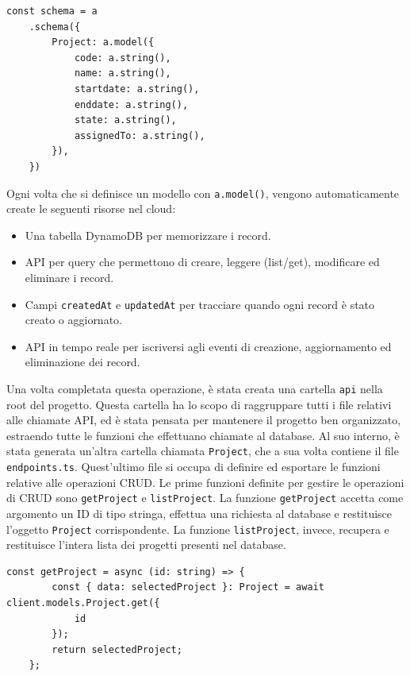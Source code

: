 \documentclass[target=bach,aauheader=,style=]{thud}
\begin{document}
\begin{lstlisting}[caption=Parte del file \texttt{amplify/data/resource.ts}]
    const schema = a
    .schema({
        Project: a.model({
            code: a.string(),
            name: a.string(),
            startdate: a.string(),
            enddate: a.string(),
            state: a.string(),
            assignedTo: a.string(),
        }),
    })
\end{lstlisting}
Ogni volta che si definisce un modello con \texttt{a.model()}, vengono automaticamente create le seguenti risorse nel cloud:
\begin{itemize}
    \item Una tabella DynamoDB per memorizzare i record.
    \item API per query che permettono di creare, leggere (list/get), modificare ed eliminare i record.
    \item Campi \texttt{createdAt} e \texttt{updatedAt} per tracciare quando ogni record è stato creato o aggiornato.
    \item API in tempo reale per iscriversi agli eventi di creazione, aggiornamento ed eliminazione dei record.
\end{itemize}
Una volta completata questa operazione, è stata creata una cartella \texttt{api} nella root del progetto. Questa cartella ha lo scopo di raggruppare tutti i file relativi alle chiamate API, ed è stata pensata per mantenere il progetto ben organizzato, estraendo tutte le funzioni che effettuano chiamate al database. Al suo interno, è stata generata un'altra cartella chiamata \texttt{Project}, che a sua volta contiene il file \texttt{endpoints.ts}. Quest'ultimo file si occupa di definire ed esportare le funzioni relative alle operazioni CRUD. 
Le prime funzioni definite per gestire le operazioni di CRUD sono \texttt{getProject} e \texttt{listProject}. La funzione \texttt{getProject} accetta come argomento un ID di tipo stringa, effettua una richiesta al database e restituisce l'oggetto \texttt{Project} corrispondente. La funzione \texttt{listProject}, invece, recupera e restituisce l'intera lista dei progetti presenti nel database.

\begin{lstlisting}[caption=funzione \texttt{getProject}]
    const getProject = async (id: string) => {
        const { data: selectedProject }: Project = await client.models.Project.get({
            id
        });
        return selectedProject;
    };
\end{lstlisting}
\end{document}
